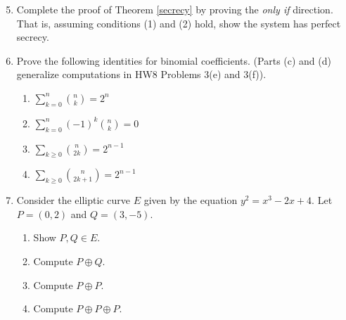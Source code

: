 \documentclass[11pt]{article}
\begin{document}
\begin{enumerate}
  \setcounter{enumi}{4}
  \item{
  Complete the proof of Theorem \ref{secrecy} by proving the \textit{only if} direction.  That is, assuming conditions (1) and (2) hold, show the system has perfect secrecy.
  }
  \item{
  Prove the following identities for binomial coefficients.  (Parts (c) and (d) generalize computations in HW8 Problems 3(e) and 3(f)).
  \begin{enumerate}
    \item{$\sum_{k=0}^n{n\choose k} = 2^n$}
    \item{$\sum_{k=0}^n(-1)^k{n\choose k} = 0$}
    \item{$\sum_{k\ge0}{n\choose 2k} = 2^{n-1}$}
    \item{$\sum_{k\ge0}{n\choose 2k+1} = 2^{n-1}$}
  \end{enumerate}
  }
  \item{
  Consider the elliptic curve $E$ given by the equation $y^2 = x^3 - 2x + 4$.  Let $P = (0,2)$ and $Q = (3,-5)$.
  \begin{enumerate}
    \item{
    Show $P,Q\in E$.
    }
    \item{
    Compute $P\oplus Q$.
    }
    \item{
    Compute $P\oplus P$.
    }
    \item{
    Compute $P\oplus P\oplus P$.
    }
  \end{enumerate}
  }
\end{enumerate}
\end{document}

